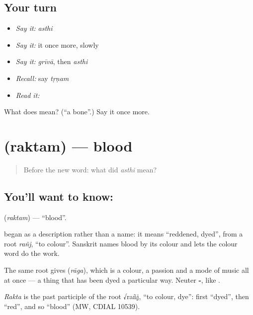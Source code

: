 \subsection*{Your turn}
\begin{itemize}
\raggedright
  \item \emph{Say it:} \emph{asthi}
  \item \emph{Say it:} it once more, slowly
  \item \emph{Say it:} \emph{grīvā}, then \emph{asthi}
  \item \emph{Recall:} say \emph{tṛṇam}
  \item \emph{Read it:} \textbf{}
\end{itemize}

\begin{tcolorbox}[breakable,colback=teal!4,colframe=teal!35!black,title={Before you move on}]
What does  mean? (\textquotedblleft{}a bone\textquotedblright{}.) Say it once more.
\end{tcolorbox}
\section[\texorpdfstring{\sk{रक्तम्} (raktam)}{रक्तम् (raktam)}]{ (raktam) — blood}

\label{lesson:SA-C34-blood}



\begin{quote}
Before the new word: what did \emph{asthi} mean?
\end{quote}

\subsection*{You'll want to know: }
\textbf{} (\emph{raktam}) — \textquotedblleft{}blood\textquotedblright{}.

\textbf{} began as a description rather than a name: it means \textquotedblleft{}reddened, dyed\textquotedblright{}, from a root \emph{rañj}, \textquotedblleft{}to colour\textquotedblright{}. Sanskrit names blood by its colour and lets the colour word do the work.

The same root gives \textbf{} (\emph{rāga}), which is a colour, a passion and a mode of music all at once — a thing that has been dyed a particular way. Neuter \textbf{-}, like \textbf{}.

\begin{cousinweb}
\emph{Rakta} is the past participle of the root √rañj, \textquotedblleft{}to colour, dye\textquotedblright{}: first \textquotedblleft{}dyed\textquotedblright{}, then \textquotedblleft{}red\textquotedblright{}, and so \textquotedblleft{}blood\textquotedblright{} (MW, CDIAL 10539).
\end{cousinweb}

